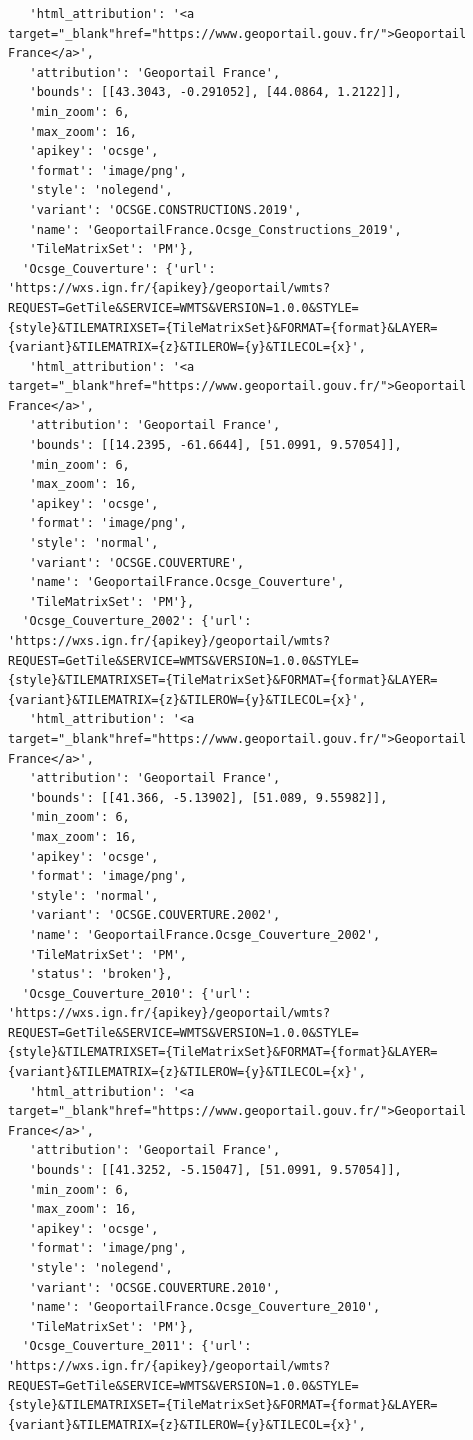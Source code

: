 \documentclass[
  letterpaper,
  DIV=11,
  numbers=noendperiod]{scrreprt}
\begin{document}
\begin{verbatim}
   'html_attribution': '<a target="_blank"href="https://www.geoportail.gouv.fr/">Geoportail France</a>',
   'attribution': 'Geoportail France',
   'bounds': [[43.3043, -0.291052], [44.0864, 1.2122]],
   'min_zoom': 6,
   'max_zoom': 16,
   'apikey': 'ocsge',
   'format': 'image/png',
   'style': 'nolegend',
   'variant': 'OCSGE.CONSTRUCTIONS.2019',
   'name': 'GeoportailFrance.Ocsge_Constructions_2019',
   'TileMatrixSet': 'PM'},
  'Ocsge_Couverture': {'url': 'https://wxs.ign.fr/{apikey}/geoportail/wmts?REQUEST=GetTile&SERVICE=WMTS&VERSION=1.0.0&STYLE={style}&TILEMATRIXSET={TileMatrixSet}&FORMAT={format}&LAYER={variant}&TILEMATRIX={z}&TILEROW={y}&TILECOL={x}',
   'html_attribution': '<a target="_blank"href="https://www.geoportail.gouv.fr/">Geoportail France</a>',
   'attribution': 'Geoportail France',
   'bounds': [[14.2395, -61.6644], [51.0991, 9.57054]],
   'min_zoom': 6,
   'max_zoom': 16,
   'apikey': 'ocsge',
   'format': 'image/png',
   'style': 'normal',
   'variant': 'OCSGE.COUVERTURE',
   'name': 'GeoportailFrance.Ocsge_Couverture',
   'TileMatrixSet': 'PM'},
  'Ocsge_Couverture_2002': {'url': 'https://wxs.ign.fr/{apikey}/geoportail/wmts?REQUEST=GetTile&SERVICE=WMTS&VERSION=1.0.0&STYLE={style}&TILEMATRIXSET={TileMatrixSet}&FORMAT={format}&LAYER={variant}&TILEMATRIX={z}&TILEROW={y}&TILECOL={x}',
   'html_attribution': '<a target="_blank"href="https://www.geoportail.gouv.fr/">Geoportail France</a>',
   'attribution': 'Geoportail France',
   'bounds': [[41.366, -5.13902], [51.089, 9.55982]],
   'min_zoom': 6,
   'max_zoom': 16,
   'apikey': 'ocsge',
   'format': 'image/png',
   'style': 'normal',
   'variant': 'OCSGE.COUVERTURE.2002',
   'name': 'GeoportailFrance.Ocsge_Couverture_2002',
   'TileMatrixSet': 'PM',
   'status': 'broken'},
  'Ocsge_Couverture_2010': {'url': 'https://wxs.ign.fr/{apikey}/geoportail/wmts?REQUEST=GetTile&SERVICE=WMTS&VERSION=1.0.0&STYLE={style}&TILEMATRIXSET={TileMatrixSet}&FORMAT={format}&LAYER={variant}&TILEMATRIX={z}&TILEROW={y}&TILECOL={x}',
   'html_attribution': '<a target="_blank"href="https://www.geoportail.gouv.fr/">Geoportail France</a>',
   'attribution': 'Geoportail France',
   'bounds': [[41.3252, -5.15047], [51.0991, 9.57054]],
   'min_zoom': 6,
   'max_zoom': 16,
   'apikey': 'ocsge',
   'format': 'image/png',
   'style': 'nolegend',
   'variant': 'OCSGE.COUVERTURE.2010',
   'name': 'GeoportailFrance.Ocsge_Couverture_2010',
   'TileMatrixSet': 'PM'},
  'Ocsge_Couverture_2011': {'url': 'https://wxs.ign.fr/{apikey}/geoportail/wmts?REQUEST=GetTile&SERVICE=WMTS&VERSION=1.0.0&STYLE={style}&TILEMATRIXSET={TileMatrixSet}&FORMAT={format}&LAYER={variant}&TILEMATRIX={z}&TILEROW={y}&TILECOL={x}',

\end{verbatim}
\end{document}
